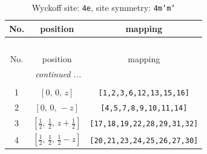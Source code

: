 \documentclass[fleqn,8pt]{jsarticle}
\begin{document}
\renewcommand{\arraystretch}{1.2}
\begin{longtable}{ccc}
\caption{Wyckoff site: {\tt 4e}, site symmetry: {\tt 4m'm'}}
 \\
 \hline \hline
No. & position & mapping \\ \hline \endfirsthead

\multicolumn{2}{l}{\tablename\ \thetable{}} \\
 \hline \hline
No. & position & mapping \\ \hline \endhead

 \hline \hline
\multicolumn{2}{r}{\footnotesize\it continued ...} \\ \endfoot

 \hline \hline
\multicolumn{2}{r}{} \\ \endlastfoot

1 & $\left[ 0,\, 0,\, z \right]$ & {\tt [1,2,3,6,12,13,15,16]} \\ \hline
2 & $\left[ 0,\, 0,\, - z \right]$ & {\tt [4,5,7,8,9,10,11,14]} \\ \hline
3 & $\left[ \frac{1}{2},\, \frac{1}{2},\, z + \frac{1}{2} \right]$ & {\tt [17,18,19,22,28,29,31,32]} \\ \hline
4 & $\left[ \frac{1}{2},\, \frac{1}{2},\, \frac{1}{2} - z \right]$ & {\tt [20,21,23,24,25,26,27,30]} \\
\end{longtable}
\renewcommand{\arraystretch}{1.2}
\end{document}
